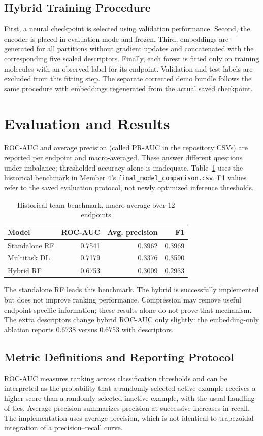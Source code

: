 \documentclass[11pt,a4paper]{article}\usepackage[margin=25mm]{geometry}\usepackage{fancyhdr}\usepackage{setspace}\usepackage{titlesec}\usepackage{xcolor}
\begin{document}
\subsection{Hybrid Training Procedure}
First, a neural checkpoint is selected using validation performance. Second, the encoder is placed in evaluation mode and frozen. Third, embeddings are generated for all partitions without gradient updates and concatenated with the corresponding five scaled descriptors. Finally, each forest is fitted only on training molecules with an observed label for its endpoint. Validation and test labels are excluded from this fitting step. The separate corrected demo bundle follows the same procedure with embeddings regenerated from the actual saved checkpoint.


\section{Evaluation and Results}
ROC-AUC and average precision (called PR-AUC in the repository CSVs) are reported per endpoint and macro-averaged. These answer different questions under imbalance; thresholded accuracy alone is inadequate. Table~\ref{tab:main} uses the historical benchmark in Member 4's \texttt{final\_model\_comparison.csv}. F1 values refer to the saved evaluation protocol, not newly optimized inference thresholds.

\begin{table}[ht]
\caption{Historical team benchmark, macro-average over 12 endpoints}
\label{tab:main}
\centering
\begin{tabular}{lrrr}\toprule
Model & ROC-AUC & Avg. precision & F1\\\midrule
Standalone RF & 0.7541 & 0.3962 & 0.3969\\
Multitask DL & 0.7179 & 0.3376 & 0.3590\\
Hybrid RF & 0.6753 & 0.3009 & 0.2933\\\bottomrule
\end{tabular}
\end{table}

The standalone RF leads this benchmark. The hybrid is successfully implemented but does not improve ranking performance. Compression may remove useful endpoint-specific information; these results alone do not prove that mechanism. The extra descriptors change hybrid ROC-AUC only slightly: the embedding-only ablation reports 0.6738 versus 0.6753 with descriptors.


\subsection{Metric Definitions and Reporting Protocol}
ROC-AUC measures ranking across classification thresholds and can be interpreted as the probability that a randomly selected active example receives a higher score than a randomly selected inactive example, with the usual handling of ties. Average precision summarizes precision at successive increases in recall. The implementation uses average precision, which is not identical to trapezoidal integration of a precision--recall curve.
\end{document}
